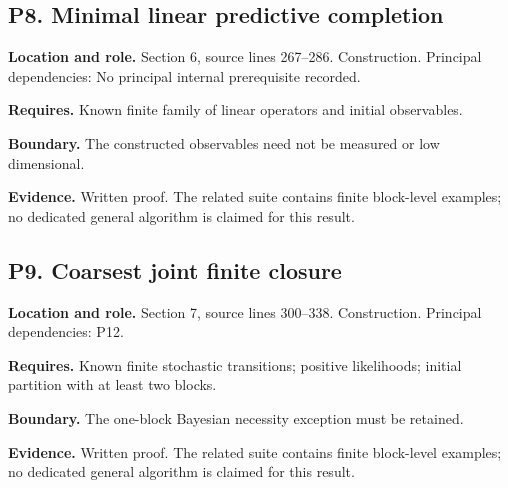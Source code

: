 \documentclass[11pt,oneside,openany]{book}
\numberwithin{equation}{section}
\begin{document}
\par\noindent\begin{minipage}{\textwidth}
\subsection{P8. Minimal linear predictive
completion}\label{LSMRegister:p8.-minimal-linear-predictive-completion}

\textbf{Location and role.} Section 6, source lines 267--286.
Construction. Principal dependencies: No principal internal prerequisite
recorded.

\textbf{Requires.} Known finite family of linear operators and initial
observables.

\textbf{Boundary.} The constructed observables need not be measured or
low dimensional.

\textbf{Evidence.} Written proof. The related suite contains finite
block-level examples; no dedicated general algorithm is claimed for this
result.
\end{minipage}\par\medskip

\par\noindent\begin{minipage}{\textwidth}
\subsection{P9. Coarsest joint finite
closure}\label{LSMRegister:p9.-coarsest-joint-finite-closure}

\textbf{Location and role.} Section 7, source lines 300--338.
Construction. Principal dependencies: P12.

\textbf{Requires.} Known finite stochastic transitions; positive
likelihoods; initial partition with at least two blocks.

\textbf{Boundary.} The one-block Bayesian necessity exception must be
retained.

\textbf{Evidence.} Written proof. The related suite contains finite
block-level examples; no dedicated general algorithm is claimed for this
result.
\end{minipage}\par\medskip
\end{document}
